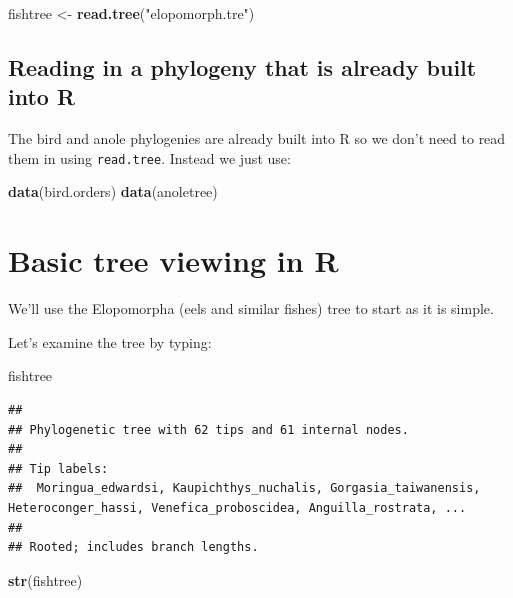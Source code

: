 \documentclass[]{book}
\newenvironment{Shaded}{\begin{snugshade}}{\end{snugshade}}
\newcommand{\KeywordTok}[1]{\textcolor[rgb]{0.13,0.29,0.53}{\textbf{{#1}}}}
\newcommand{\StringTok}[1]{\textcolor[rgb]{0.31,0.60,0.02}{{#1}}}
\newcommand{\NormalTok}[1]{{#1}}
\theoremstyle{definition}
\theoremstyle{definition}
\theoremstyle{definition}
\theoremstyle{remark}
\begin{document}
\begin{Shaded}
\begin{Highlighting}[]
\NormalTok{fishtree <-}\StringTok{ }\KeywordTok{read.tree}\NormalTok{(}\StringTok{"elopomorph.tre"}\NormalTok{)}
\end{Highlighting}
\end{Shaded}

\subsection{Reading in a phylogeny that is already built into
R}\label{reading-in-a-phylogeny-that-is-already-built-into-r}

The bird and anole phylogenies are already built into R so we don't need
to read them in using \texttt{read.tree}. Instead we just use:

\begin{Shaded}
\begin{Highlighting}[]
\KeywordTok{data}\NormalTok{(bird.orders)}
\KeywordTok{data}\NormalTok{(anoletree)}
\end{Highlighting}
\end{Shaded}

\section{Basic tree viewing in R}\label{basic-tree-viewing-in-r}

We'll use the Elopomorpha (eels and similar fishes) tree to start as it
is simple.

Let's examine the tree by typing:

\begin{Shaded}
\begin{Highlighting}[]
\NormalTok{fishtree}
\end{Highlighting}
\end{Shaded}

\begin{verbatim}
## 
## Phylogenetic tree with 62 tips and 61 internal nodes.
## 
## Tip labels:
##  Moringua_edwardsi, Kaupichthys_nuchalis, Gorgasia_taiwanensis, Heteroconger_hassi, Venefica_proboscidea, Anguilla_rostrata, ...
## 
## Rooted; includes branch lengths.
\end{verbatim}

\begin{Shaded}
\begin{Highlighting}[]
\KeywordTok{str}\NormalTok{(fishtree)}
\end{Highlighting}
\end{Shaded}
\end{document}
